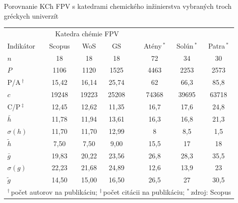 \documentclass{beamer}
\begin{document}
%
%
\begin{frame}{Porovnanie KCh FPV s katedrami chemického inžinierstva vybraných troch gréckych univerzít}
  \begin{table}
    \footnotesize
    \begin{tabular}{lccclccc}
      \toprule
      & \multicolumn{3}{c}{Katedra chémie FPV} & & \multicolumn{3}{c}{\citet{Kazakis2015}} \\
      \cmidrule{2-4}\cmidrule{6-8}
      Indikátor & Scopus & WoS & GS & & Atény\,$^\ast$ & Solún\,$^\ast$ & Patra\,$^\ast$ \\
      \midrule
      $n$            & 18    & 18    & 18    & & 72    & 34    & 30    \\
      \rowcolor{LBlue} $P$            & 1106  & 1120  & 1525  & & 4463  & 2253  & 2573  \\
      \rowcolor{LBlue} P/A\,$^\dagger$  & 15,42 & 16,14 & 25,74 & & 62    & 66,3  & 85,8  \\
      $c$            & 19248 & 19223 & 25208 & & 74368 & 39695 & 63718 \\
      C/P\,$^\ddagger$ & 12,45 & 12,62 & 11,35 & & 16,7  & 17,6  & 24,8  \\
      \rowcolor{LBlue} $\bar{h}$      & 11,78 & 11,94 & 13,61 & & 16,3  & 16,8  & 21,3  \\
      \rowcolor{LBlue} $\sigma (h)$   & 11,70 & 11,70 & 12,99 & & 8     & 8,5   & 1,5   \\
      \rowcolor{LBlue} $\tilde{h}$    & 7,50  & 7,50  & 9,00  & & 15,5  & 17    & 18    \\
      $\bar{g}$      & 19,83 & 20,22 & 23,56 & & 26,8  & 28,3  & 35,5  \\
      $\sigma (g)$   & 22,23 & 21,68 & 24,89 & & 12,6  & 13,9  & 23    \\
      $\tilde{g}$    & 14,50 & 15,00 & 16,50 & & 26,5  & 27    & 30,5  \\
      \bottomrule
      \multicolumn{8}{l}{\tiny $^\dagger$\,počet autorov na publikáciu; $^\ddagger$\,počet citácii na publikáciu; $^\ast$\,zdroj: Scopus}
    \end{tabular}
  \end{table}
\end{frame}
\end{document}

